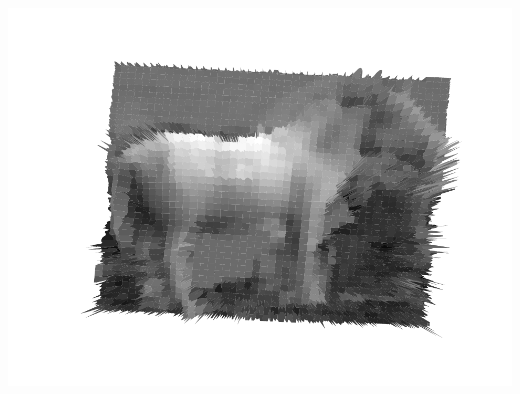 {\centering
    \includegraphics[scale=0.7]{informe/imagenes/profundidadesCaballoNormalescatedra.pdf} \\
}
